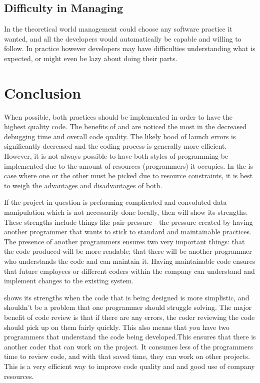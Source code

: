 \documentclass{article}
\begin{document}
\subsection{Difficulty in Managing}

In the theoretical world management could choose any software practice it wanted, and all the developers would automatically be capable and willing to follow. In practice however developers may have difficulties understanding what is expected, or might even be lazy about doing their parts.

\section{Conclusion}


When possible, both practices should be implemented in order to have the highest quality code. The benefits of \PP and \CR are noticed the most in the decreased debugging time and overall code quality. The likely hood of launch errors is significantly decreased and the coding process is generally more efficient. However, it is not always possible to have both styles of programming be implemented due to the amount of resources (programmers) it occupies. In the is case where one or the other must be picked due to resource constraints, it is best to weigh the advantages and disadvantages of both.

If the project in question is preforming complicated and convoluted data manipulation which is not necessarily done locally, then \PP will show its strengths. These strengths include things like pair-pressure\cite{William} - the pressure created by having another programmer that wants to stick to standard and maintainable practices. The presence of another programmers ensures two very important things: that the code produced will be more readable; that there will be another programmer who understands the code and can maintain it. Having maintainable code ensures that future employees or different coders within the company can understand and implement changes to the existing system. 

\CR shows its strengths when the code that is being designed is more simplistic, and shouldn't be a problem that one programmer should struggle solving. The major benefit of code review is that if there are any errors, the coder reviewing the code should pick up on them fairly quickly. This also means that you have two programmers that understand the code being developed.This ensures that there is another coder that can work on the project. It consumes less of the programmers time to review code, and with that saved time, they can work on other projects. This is a very efficient way to improve code quality and and good use of company resources. 







\end{document}
